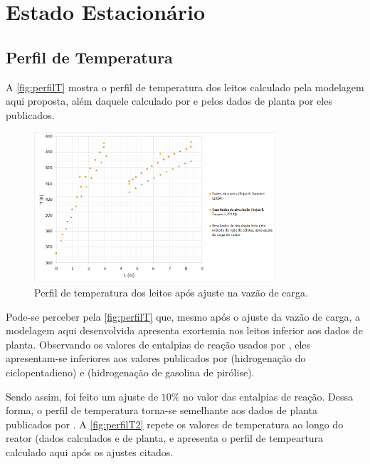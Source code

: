 \section{Estado Estacionário} \label{sec:estadoestacionario}

\subsection{Perfil de Temperatura} \label{sec:perfildetemperatura}

A \autoref{fig:perfilT} mostra o perfil de temperatura dos leitos
calculado pela modelagem aqui proposta, além daquele calculado por
 e pelos dados de planta por eles publicados.  

\begin{figure}[htb]
\centering \includegraphics[width=0.8\textwidth]{images/Chap4/perfilT.png}
\caption{Perfil de temperatura dos leitos após ajuste na vazão de carga.}
\label{fig:perfilT}
\end{figure}

Pode-se perceber pela \autoref{fig:perfilT} que, mesmo após o ajuste da vazão
de carga, a modelagem aqui desenvolvida apresenta exortemia nos leitos inferior aos
dados de planta. Observando os valores de entalpias de reação usados por
, eles apresentam-se inferiores aos valores publicados
por  (hidrogenação do ciclopentadieno) e
 (hidrogenação de gasolina de pirólise).

Sendo assim, foi feito um ajuste de $10 \%$ no valor das entalpias de reação.
Dessa forma, o perfil de temperatura torna-se semelhante aos dados de planta
publicados por . A \autoref{fig:perfilT2} repete os
valores de temperatura ao longo do reator (dados calculados e de planta, e
apresenta o perfil de tempeartura calculado aqui após os ajustes citados.


